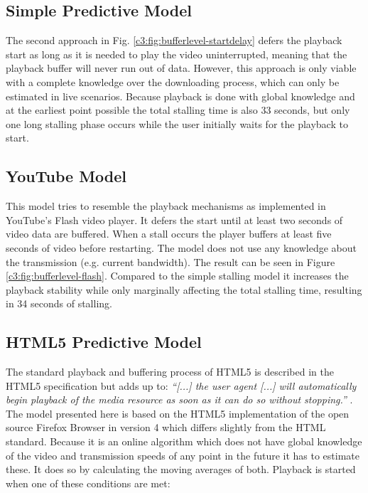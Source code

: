 \subsection{Simple Predictive Model}

The second approach in Fig. \ref{c3:fig:bufferlevel-startdelay} defers the playback start as long as it is needed to play the video uninterrupted, meaning that the playback buffer will never run out of data. However, this approach is only viable with a complete knowledge over the downloading process, which can only be estimated in live scenarios. Because playback is done with global knowledge and at the earliest point possible the total stalling time is also 33 seconds, but only one long stalling phase occurs while the user initially waits for the playback to start.


\subsection{YouTube Model}

This model tries to resemble the playback mechanisms as implemented in YouTube's Flash video player.
It defers the start until at least two seconds of video data are buffered. When a stall occurs the player buffers at least five seconds of video before restarting. The model does not use any knowledge about the transmission (e.g. current bandwidth).
The result can be seen in Figure \ref{c3:fig:bufferlevel-flash}. Compared to the simple stalling model it increases the playback stability while only marginally affecting the total stalling time, resulting in 34 seconds of stalling.

\subsection{HTML5 Predictive Model}
The standard playback and buffering process of HTML5 is described in the HTML5 specification but adds up to:
\textit{``[...] the user agent [...] will automatically begin playback of the media resource as soon as it can do so without stopping.''} \cite{html5video}. The model presented here is based on the HTML5 implementation of the open source Firefox Browser in version 4 which differs slightly from the HTML standard. Because it is an online algorithm which does not have global knowledge of the video and transmission speeds of any point in the future it has to estimate these. It does so by calculating the moving averages of both. Playback is started when one of these conditions are met:

